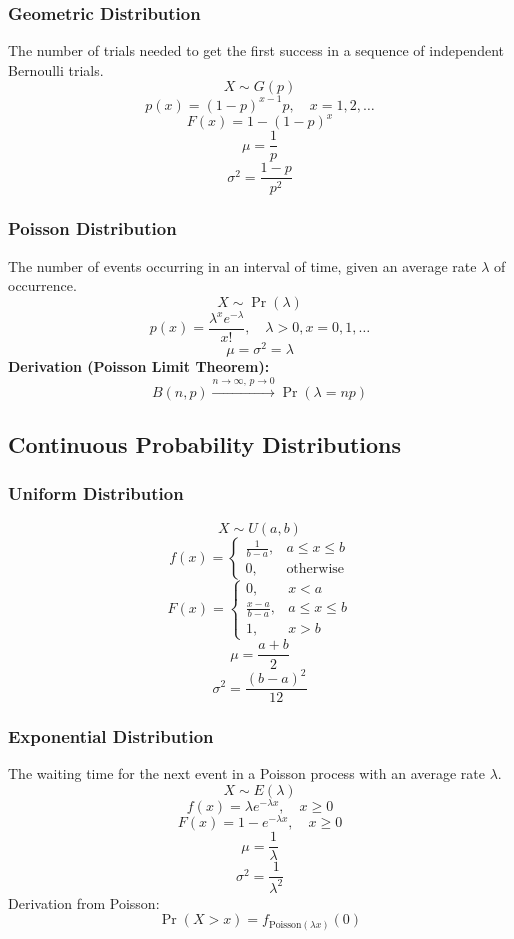 \documentclass{article}
\begin{document}
\subsubsection{Geometric Distribution}
The number of trials needed to get the first success in a sequence of independent Bernoulli trials.
\[ X \sim G(p) \]
\[ p(x) = (1-p)^{x-1}p, \quad x=1,2,\dots \]
\[ F(x) = 1 - (1-p)^x \]
\[ \mu = \frac{1}{p} \]
\[ \sigma^2 = \frac{1-p}{p^2} \]

\subsubsection{Poisson Distribution}
The number of events occurring in an interval of time, given an average rate \( \lambda \) of occurrence.
\[ X \sim \Pr(\lambda) \]
\[ p(x) = \frac{\lambda^x e^{-\lambda}}{x!}, \quad \lambda>0, x=0,1,\dots \]
\[ \mu = \sigma^2 = \lambda \]
\textbf{Derivation (Poisson Limit Theorem):}
\[
    B(n, p) \xrightarrow{n \to \infty,\, p \to 0} \Pr(\lambda = np)
\]

\subsection{Continuous Probability Distributions}

\subsubsection{Uniform Distribution}
\[
    X \sim U(a, b)
\]
\[
    f(x) =
    \begin{cases}
        \frac{1}{b-a}, & a \leq x \leq b \\
        0, & \text{otherwise}
    \end{cases}
\]
\[
    F(x) =
    \begin{cases}
        0, & x < a \\
        \frac{x-a}{b-a}, & a \leq x \leq b \\
        1, & x > b
    \end{cases}
\]
\[
    \mu = \frac{a+b}{2}
\]
\[
    \sigma^2 = \frac{(b-a)^2}{12}
\]

\subsubsection{Exponential Distribution}
The waiting time for the next event in a Poisson process with an average rate \( \lambda \).
\[ X \sim E(\lambda) \]
\[
    f(x) = \lambda e^{-\lambda x}, \quad x \geq 0
\]
\[
    F(x) = 1 - e^{-\lambda x}, \quad x \geq 0
\]
\[
    \mu = \frac{1}{\lambda}
\]
\[
    \sigma^2 = \frac{1}{\lambda^2}
\]
Derivation from Poisson:
\[
    \Pr(X>x) = f_{\text{Poisson}(\lambda x)}(0)
\]
\end{document}
